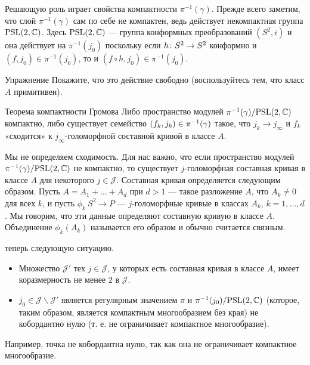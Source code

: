 Решающую роль играет свойства компактности $\pi^{-1} (\gamma)$.
Прежде всего заметим, что слой $\pi^{-1} (\gamma)$ сам по себе не компактен, ведь действует некомпактная группа $\mathrm{PSL}(2, \mathbb{C})$.
Здесь $\mathrm{PSL}(2, \mathbb{C})$ --- группа конформных преобразований $(S^2, i)$ и она действует на $\pi^{-1} (j_0)$ поскольку
если $h\: S^2 \z\to S^2$ конформно и $(f, j_0) \in \pi^{-1} (j_0)$, то и $(f \circ h, j_0) \in \pi^{-1} (j_0)$.

\begin{ex*}{Упражнение}
Покажите, что это действие свободно (воспользуйтесь тем, что класс $A$ примитивен).
\end{ex*}

\begin{thm*}{Теорема компактности Громова}
Либо пространство модулей $\pi^{-1} (\gamma)/\mathrm{PSL}(2, \mathbb{C})$ компактно, либо существует семейство $(f_k, j_k) \z\in \pi^{-1} (\gamma)$ такое, что $j_k \to j_\infty$ и $f_k$ «сходится» к $j_\infty$-голоморфной составной кривой в классе $A$.
\end{thm*}

Мы не определяем сходимость.
Для нас важно, что если пространство модулей $\pi^{-1} (\gamma)/\mathrm{PSL}(2, \mathbb{C})$ не компактно, то существует $j$-голоморфная составная кривая в классе $A$ для некоторого $j \in \mathcal{J}$.
Составная кривая определяется следующим образом.
Пусть $A = A_1 +\dots+ A_d$ при $d > 1$ --- такое разложение $A$, что $A_k \ne 0$ для всех $k$, и пусть $\phi_k \: S^2 \to P$ --- $j$-голоморфные кривые в классах $A_k$, $k = 1,\dots,d$.
Мы говорим, что эти данные определяют составную кривую в классе $A$.
Объединение $\phi_k (A_k)$ называется его образом и обычно считается связным.

 теперь следующую ситуацию.
\begin{itemize}
\item Множество $\mathcal{J}'$ тех $j \in \mathcal{J}$, у которых есть составная кривая в классе $A$, имеет коразмерность не менее $2$ в $\mathcal{J}$.

\item $j_0 \in \mathcal{J}\backslash \mathcal{J}'$ является регулярным значением $\pi$ и $\pi^{-1} (j_0)/\mathrm{PSL}(2, \mathbb{C})$ (которое, таким образом, является компактным многообразием без края) не кобордантно нулю (т. е. не ограничивает компактное многообразие).
 
\end{itemize}
Например, точка не кобордантна нулю, так как она не ограничивает компактное многообразие.

